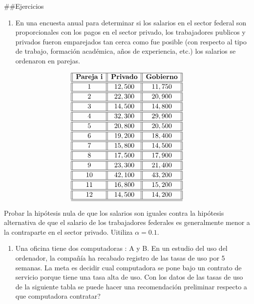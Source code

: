 \documentclass[
  a4paper,
  oneside,
  openany]{book}
\providecommand{\tightlist}{%
  \setlength{\itemsep}{0pt}\setlength{\parskip}{0pt}}
\begin{document}
\#\#Ejercicios

\begin{enumerate}
\def\labelenumi{\arabic{enumi}.}
\tightlist
\item
  En una encuesta anual para determinar si los salarios en el sector federal son proporcionales con los pagos en el sector privado, los trabajadores publicos y privados fueron emparejados tan cerca como fue posible (con respecto al tipo de trabajo, formación académica, años de experiencia, etc.) los salarios se ordenaron en parejas.
\end{enumerate}

\[
\begin{array}{||c| |c| |c||} 
\hline 
\textbf{Pareja i}  & \textbf{Privado} & \textbf{Gobierno} \\ 
\hline
\hline
1 &12,500& 11,750 \\
\hline
\hline
2& 22,300 &20,900 \\
\hline
\hline
3 &14,500 &14,800 \\
\hline
\hline
4 &32,300 &29,900 \\
\hline
\hline
5 &20,800 &20,500 \\
\hline
\hline
6 &19,200 &18,400 \\
\hline
\hline
7 &15,800 &14,500 \\
\hline
\hline
8 &17,500 &17,900 \\
\hline
\hline
9 &23,300 &21,400 \\
\hline
\hline
10 &42,100 &43,200 \\
\hline
\hline
11 &16,800 &15,200 \\
\hline
\hline
12& 14,500 &14,200 \\
\hline
\hline
\end{array}
\]

Probar la hipótesis nula de que los salarios son iguales contra la hipótesis alternativa de que el salario de los trabajadores federales es generalmente menor a la contraparte en el sector privado. Uitiliza \(\alpha=0.1\).

\begin{enumerate}
\def\labelenumi{\arabic{enumi}.}
\setcounter{enumi}{1}
\tightlist
\item
  Una oficina tiene dos computadoras : A y B. En un estudio del uso del ordenador, la compañía ha recabado registro de las tasas de uso por 5 semanas. La meta es decidir cual computadora se pone bajo un contrato de servicio porque tiene una tasa alta de uso. Con los datos de las tasas de uso de la siguiente tabla se puede hacer una recomendación preliminar respecto a que computadora contratar?
\end{enumerate}
\end{document}
